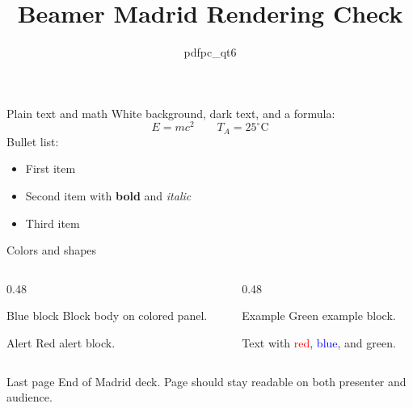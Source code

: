 \documentclass[aspectratio=169]{beamer}
\title{Beamer Madrid Rendering Check}
\author{pdfpc\_qt6}
\date{}
\begin{document}
\begin{frame}
  \titlepage
\end{frame}

\begin{frame}{Plain text and math}
  White background, dark text, and a formula:
  \[
    E = mc^2 \qquad T_A = 25^\circ\mathrm{C}
  \]
  Bullet list:
  \begin{itemize}
    \item First item
    \item Second item with \textbf{bold} and \textit{italic}
    \item Third item
  \end{itemize}
\end{frame}

\begin{frame}{Colors and shapes}
  \begin{columns}[T]
    \begin{column}{0.48\textwidth}
      \begin{block}{Blue block}
        Block body on colored panel.
      \end{block}
      \begin{alertblock}{Alert}
        Red alert block.
      \end{alertblock}
    \end{column}
    \begin{column}{0.48\textwidth}
      \begin{exampleblock}{Example}
        Green example block.
      \end{exampleblock}
      Text with \textcolor{red}{red}, \textcolor{blue}{blue},
      and \textcolor{green!60!black}{green}.
    \end{column}
  \end{columns}
\end{frame}

\begin{frame}{Last page}
  End of Madrid deck. Page should stay readable on both presenter and audience.
\end{frame}
\end{document}

